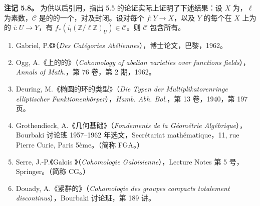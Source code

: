\textbf{注记 5.8。} 为供以后引用，指出 5.5 的论证实际上证明了下述结果：设 $X$ 为，$\ell$ 为素数，$\mathcal C$ 是的的一个，对及封闭。设对每个 $f:Y\to X$，以及 $Y$ 的每个在 $X$ 上为的 $i:U\to Y$，有 $f_*(i_!(\mathbb Z/\ell\mathbb Z)_U)\in\mathcal C$。则 $\mathcal C$ 包含所有。

\begin{enumerate}
\item[{[1]}] Gabriel, P.《》（\textit{Des Catégories Abéliennes}），博士论文，巴黎，1962。
\item[{[2]}] Ogg, A.《上的的》（\textit{Cohomology of abelian varieties over functions fields}），\textit{Annals of Math.}，第 76 卷，第 2 期，1962。
\item[{[3]}] Deuring, M.《椭圆的环的类型》（\textit{Die Typen der Multiplikatorenringe elliptischer Funktionenkörper}），\textit{Hamb. Abh. Bol.}，第 13 卷，1940，第 197 页。
\item[{[4]}] Grothendieck, A.《几何基础》（\textit{Fondements de la Géométrie Algébrique}），Bourbaki 讨论班 1957--1962 年选文，Secrétariat mathématique，11, rue Pierre Curie, Paris 5ème。（简称 FGA。）
\item[{[5]}] Serre, J.-P.《Galois 》（\textit{Cohomologie Galoisienne}），Lecture Notes 第 5 号，Springer。（简称 CG。）
\item[{[6]}] Douady, A.《紧群的》（\textit{Cohomologie des groupes compacts totalement discontinus}），Bourbaki 讨论班，第 189 讲。
\end{enumerate}
